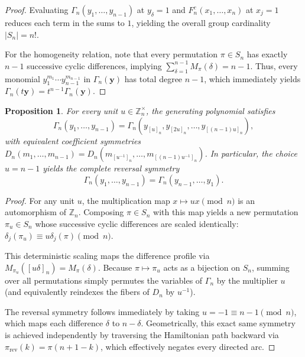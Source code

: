 \documentclass[11pt,a4paper]{amsart}
\newtheorem{proposition}[theorem]{Proposition}
\newcommand{\1}{\mathbf{1}}
\begin{document}
\begin{proof}
Evaluating $\Gamma_n(y_1, \dots, y_{n-1})$ at $y_\delta = 1$ and $F_n^c(x_1, \dots, x_n)$ at $x_j = 1$ reduces each term in the sums to $1$, yielding the overall group cardinality $|S_n| = n!$. 

For the homogeneity relation, note that every permutation $\pi \in S_n$ has exactly $n-1$ successive cyclic differences, implying $\sum_{\delta=1}^{n-1} M_\pi(\delta) = n-1$. Thus, every monomial $y_1^{m_1} \cdots y_{n-1}^{m_{n-1}}$ in $\Gamma_n(\bm{y})$ has total degree $n-1$, which immediately yields $\Gamma_n(t\bm{y}) = t^{n-1}\Gamma_n(\bm{y})$.
\end{proof}

\begin{proposition}
\label{prop:cyclic-symmetry}
For every unit $u \in \mathbb{Z}_n^\times$, the generating polynomial satisfies
\begin{equation}
\Gamma_n(y_1, \dots, y_{n-1}) = \Gamma_n\left(y_{[u]_n}, y_{[2u]_n}, \dots, y_{[(n-1)u]_n}\right),
\end{equation}
with equivalent coefficient symmetries $D_n(m_1, \dots, m_{n-1}) = D_n\left(m_{[u^{-1}]_n}, \dots, m_{[(n-1)u^{-1}]_n}\right)$.
In particular, the choice $u = n-1$ yields the complete reversal symmetry
\begin{equation}
\Gamma_n(y_1, \dots, y_{n-1}) = \Gamma_n(y_{n-1}, \dots, y_1).
\end{equation}
\end{proposition}

\begin{proof}
For any unit $u$, the multiplication map $x \mapsto ux \pmod n$ is an automorphism of $\mathbb{Z}_n$. Composing $\pi \in S_n$ with this map yields a new permutation $\pi_u \in S_n$ whose successive cyclic differences are scaled identically: $\delta_j(\pi_u) \equiv u \delta_j(\pi) \pmod n$. 

This deterministic scaling maps the difference profile via $M_{\pi_u}([u\delta]_n) = M_\pi(\delta)$. Because $\pi \mapsto \pi_u$ acts as a bijection on $S_n$, summing over all permutations simply permutes the variables of $\Gamma_n$ by the multiplier $u$ (and equivalently reindexes the fibers of $D_n$ by $u^{-1}$).

The reversal symmetry follows immediately by taking $u = -1 \equiv n-1 \pmod n$, which maps each difference $\delta$ to $n-\delta$. Geometrically, this exact same symmetry is achieved independently by traversing the Hamiltonian path backward via $\pi_{\mathrm{rev}}(k) = \pi(n+1-k)$, which effectively negates every directed arc.
\end{proof}
\end{document}

